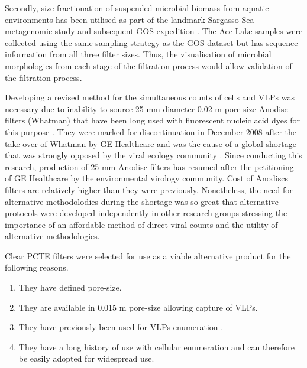 Secondly, size fractionation of suspended microbial biomass from aquatic environments has been utilised as part of the landmark Sargasso Sea metagenomic study \cite{Venter2004} and subsequent \ac{GOS} expedition \cite{Rusch2007}.
The Ace Lake samples were collected using the same sampling strategy as the \ac{GOS} dataset but has sequence information from all three filter sizes. 
Thus, the visualisation of microbial morphologies from each stage of the filtration process would allow validation of the filtration process.

Developing a revised method for the simultaneous counts of cells and \acp{VLP} was necessary due to inability to source 25 mm diameter 0.02 \textmu{}m pore-size Anodisc filters (Whatman) that have been long used with fluorescent nucleic acid dyes for this purpose \cite{Hennes1995, Noble1998}. 
They were marked for discontinuation in December 2008 after the take over of Whatman by GE Healthcare and was the cause of a global shortage that was strongly opposed by the viral ecology community \cite{Torrice2009}.
Since conducting this research, production of 25 mm Anodisc filters has resumed after the petitioning of GE Healthcare by the environmental virology community. 
Cost of Anodiscs filters are relatively higher than they were previously. %
Nonetheless, the need for alternative methodolodies during the shortage was so great that alternative protocols were developed independently in other research groups \cite{Budinoff2011,Diemer2012} stressing the importance of an affordable method of direct viral counts and the utility of alternative methodologies. %

Clear \ac{PCTE} filters were selected for use as a viable alternative product for the following reasons. 
\begin{enumerate}
\item They have defined pore-size. %
\item They are available in 0.015 \textmu{}m pore-size allowing capture of \acp{VLP}.
\item They have previously been used for \acp{VLP} enumeration \cite{Hara1991,Proctor1992}.
\item They have a long history of use with cellular enumeration \cite{Hobbie1977} and can therefore be easily adopted for widespread use.
\end{enumerate}


